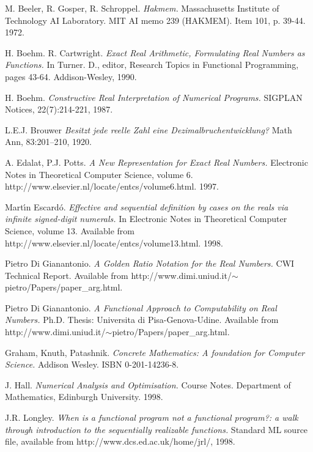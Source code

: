 \documentclass[12pt]{article}
\begin{document}
\begin{thebibliography}{20}
  
 M.  Beeler, R.  Gosper, R. Schroppel. {\em
    Hakmem.} Massachusetts Institute of Technology AI Laboratory. MIT
  AI memo 239 (HAKMEM).  Item 101, p.  39-44. 1972.
  
 H. Boehm. R. Cartwright.  {\em Exact Real
    Arithmetic, Formulating Real Numbers as Functions.} In Turner. D.,
  editor, Research Topics in Functional Programming, pages 43-64.
  Addison-Wesley, 1990.
  
 H. Boehm.  {\em Constructive Real Interpretation of
    Numerical Programs.} SIGPLAN Notices, 22(7):214-221, 1987.

 L.E.J. Brouwer
  {\em Besitzt jede reelle {Z}ahl eine {D}ezimalbruchentwicklung?}
  Math Ann, 83:201--210, 1920.
  
 A.  Edalat, P.J. Potts. {\em A New Representation
    for Exact Real Numbers.} Electronic Notes in Theoretical Computer
  Science, volume 6.
  http://www.elsevier.nl/locate/entcs/volume6.html. 1997.
  
 Mart\' \i n Escard\'o. {\em Effective and
    sequential definition by cases on the reals via infinite
    signed-digit numerals.} In Electronic Notes in Theoretical
  Computer Science, volume 13.  Available from
  http://www.elsevier.nl/locate/entcs/volume13.html.  1998.
  
 Pietro Di Gianantonio. {\em A Golden Ratio
    Notation for the Real Numbers.} CWI Technical Report.  Available
  from http://www.dimi.uniud.it/$\sim$pietro/Papers/paper\_arg.html.
  
 Pietro Di Gianantonio. {\em A Functional
    Approach to Computability on Real Numbers.} Ph.D. Thesis:
  Universita di Pisa-Genova-Udine. Available from
  http://www.dimi.uniud.it/$\sim$pietro/Papers/paper\_arg.html.
  
 Graham, Knuth, Patashnik. {\em Concrete
    Mathematics: A foundation for Computer Science.} Addison Wesley.
  ISBN 0-201-14236-8.
  
 J. Hall. {\em Numerical Analysis and Optimisation.}
  Course Notes. Department of Mathematics, Edinburgh University.
  1998.
  
 J.R. Longley. {\em When is a functional program
    not a functional program?: a walk through introduction to the
    sequentially realizable functions.} Standard ML source file,
  available from http://www.dcs.ed.ac.uk/home/jrl/, 1998.
  

\end{thebibliography}
\end{document}
